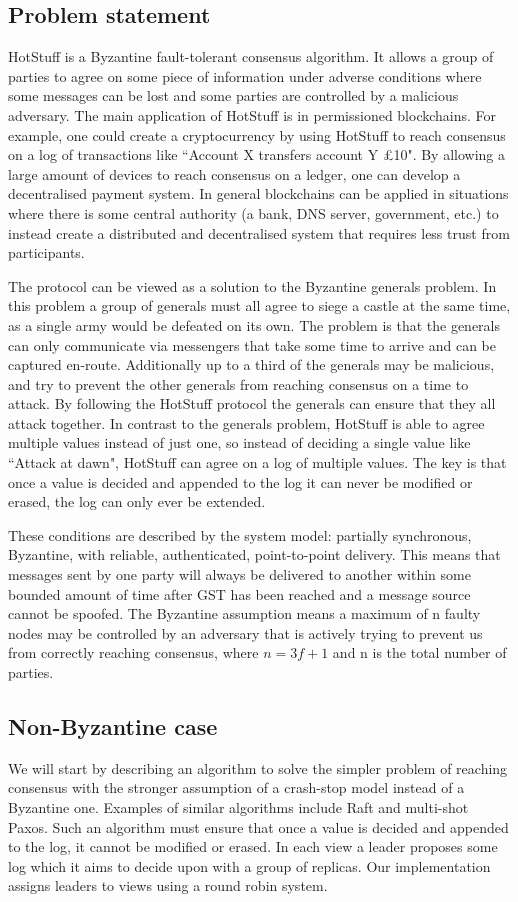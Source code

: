 \subsection{Problem statement}
HotStuff is a Byzantine fault-tolerant consensus algorithm. It allows a group of parties to agree on some piece of information under adverse conditions where some messages can be lost and some parties are controlled by a malicious adversary. The main application of HotStuff is in permissioned blockchains. For example, one could create a cryptocurrency by using HotStuff to reach consensus on a log of transactions like ``Account X transfers account Y £10". By allowing a large amount of devices to reach consensus on a ledger, one can develop a decentralised payment system. In general blockchains can be applied in situations where there is some central authority (a bank, DNS server, government, etc.) to instead create a distributed and decentralised system that requires less trust from participants.

The protocol can be viewed as a solution to the Byzantine generals problem. In this problem a group of generals must all agree to siege a castle at the same time, as a single army would be defeated on its own. The problem is that the generals can only communicate via messengers that take some time to arrive and can be captured en-route. Additionally up to a third of the generals may be malicious, and try to prevent the other generals from reaching consensus on a time to attack. By following the HotStuff protocol the generals can ensure that they all attack together. In contrast to the generals problem, HotStuff is able to agree multiple values instead of just one, so instead of deciding a single value like ``Attack at dawn", HotStuff can agree on a log of multiple values. The key is that once a value is decided and appended to the log it can never be modified or erased, the log can only ever be extended.

These conditions are described by the system model: partially synchronous, Byzantine, with reliable, authenticated, point-to-point delivery. This means that messages sent by one party will always be delivered to another within some bounded amount of time after GST has been reached and a message source cannot be spoofed. The Byzantine assumption means a maximum of n faulty nodes may be controlled by an adversary that is actively trying to prevent us from correctly reaching consensus, where $n = 3f + 1$ and n is the total number of parties.

\subsection{Non-Byzantine case}
We will start by describing an algorithm to solve the simpler problem of reaching consensus with the stronger assumption of a crash-stop model instead of a Byzantine one. Examples of similar algorithms include Raft and multi-shot Paxos. Such an algorithm must ensure that once a value is decided and appended to the log, it cannot be modified or erased. In each view a leader proposes some log which it aims to decide upon with a group of replicas. Our implementation assigns leaders to views using a round robin system.


